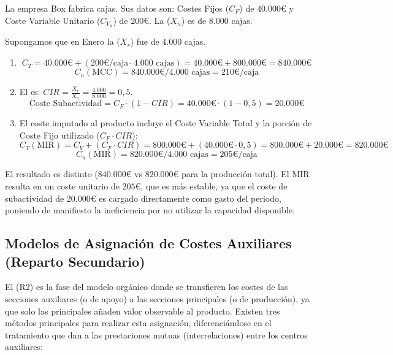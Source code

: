 \begin{ejemplo}
La empresa Box fabrica cajas. Sus datos son: Costes Fijos ($C_F$) de $40.000 €$ y Coste Variable Unitario ($C_{V_u}$) de $200 €$. La  ($X_n$) es de $8.000$ cajas.

Supongamos que en Enero la  ($X_r$) fue de $4.000$ cajas.

\begin{enumerate}
    \item {}
    $$
    C_T = 40.000 € + (200 €/\text{caja} \cdot 4.000 \text{ cajas}) = 40.000 € + 800.000 € = 840.000 €
    $$
    $$
    C_u (\text{MCC}) = 840.000 € / 4.000 \text{ cajas} = 210 €/\text{caja}
    $$
    \item {}
    El  es: $C I R = \frac{X_r}{X_n} = \frac{4.000}{8.000} = 0,5$.
    $$
    \text{Coste Subactividad} = C_F \cdot (1 - C I R) = 40.000 € \cdot (1 - 0,5) = 20.000 €
    $$
    \item {}
    El coste imputado al producto incluye el Coste Variable Total y la porción de Coste Fijo utilizado ($C_F \cdot CIR$):
    $$
    C_T (\text{MIR}) = C_{V} + (C_F \cdot C I R) = 800.000 € + (40.000 € \cdot 0,5) = 800.000 € + 20.000 € = 820.000 €
    $$
    $$
    C_u (\text{MIR}) = 820.000 € / 4.000 \text{ cajas} = 205 €/\text{caja}
    $$
\end{enumerate}
 El resultado es distinto ($840.000 €$ vs $820.000 €$ para la producción total). El MIR resulta en un coste unitario de $205 €$, que es más estable, ya que el coste de subactividad de $20.000 €$ es cargado directamente como gasto del periodo, poniendo de manifiesto la ineficiencia por no utilizar la capacidad disponible.
\end{ejemplo}

\subsection{Modelos de Asignación de Costes Auxiliares (Reparto Secundario)}

El  (R2) es la fase del modelo orgánico donde se transfieren los costes de las secciones auxiliares (o de apoyo) a las secciones principales (o de producción), ya que solo las principales añaden valor observable al producto. Existen tres métodos principales para realizar esta asignación, diferenciándose en el tratamiento que dan a las prestaciones mutuas (interrelaciones) entre los centros auxiliares:

